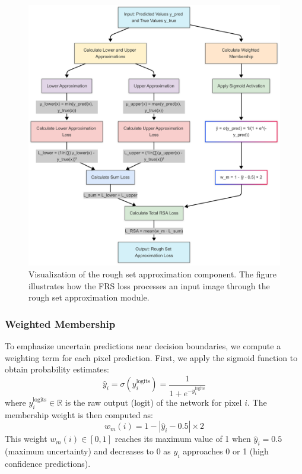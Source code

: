 \documentclass[review]{elsarticle}
\begin{document}
\begin{figure}[t]
    \centering
    \includegraphics[scale=0.09]{Rough Set.png}
    \caption{Visualization of the rough set approximation component. The figure illustrates how the FRS loss processes an input image through the rough set approximation module.}
    \label{Fig.RoughSet Component}
\end{figure}

\subsubsection{Weighted Membership}
To emphasize uncertain predictions near decision boundaries, we compute a weighting term for each pixel prediction. First, we apply the sigmoid function to obtain probability estimates:
\begin{equation}
    \hat{y}_i = \sigma(y^{\text{logits}}_i) = \frac{1}{1 + e^{-y^{\text{logits}}_i}}
\end{equation}
where $y^{\text{logits}}_i \in \mathbb{R}$ is the raw output (logit) of the network for pixel $i$. The membership weight is then computed as:
\begin{equation}\label{Eq-6}
    w_m(i) = 1 - \left| \hat{y}_i - 0.5 \right| \times 2
\end{equation}
This weight $w_m(i) \in [0,1]$ reaches its maximum value of 1 when $\hat{y}_i = 0.5$ (maximum uncertainty) and decreases to 0 as $\hat{y}_i$ approaches 0 or 1 (high confidence predictions).
\end{document}
